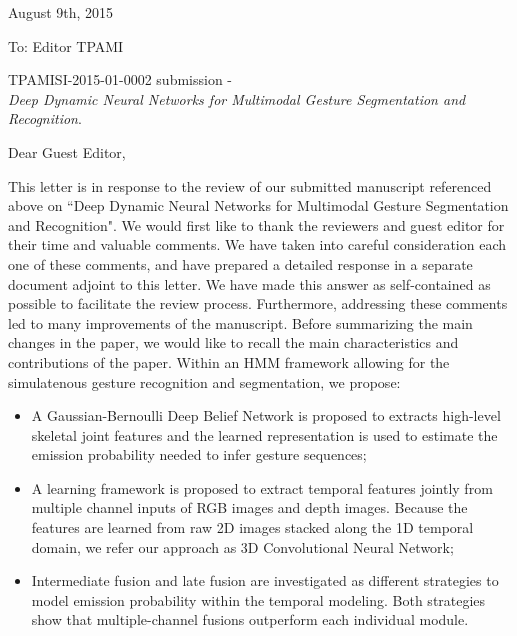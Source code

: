 \documentclass[12pt]{article}
\begin{document}
\begin{center}
\end{center}

\newcommand{\rev}[1]{{\noindent {\bf Comment:} {\it #1}}~\\}
\newcommand{\ans}[1]{{\noindent {\bf Response:} #1}~\\}


\begin{flushleft}
August 9th, 2015
\end{flushleft}

\vspace*{3mm}

\begin{flushleft}
To: Editor TPAMI
\end{flushleft}

\begin{flushleft}
TPAMISI-2015-01-0002 submission - \\
{\em Deep Dynamic Neural Networks for Multimodal Gesture Segmentation and Recognition}.
\end{flushleft}

\vspace*{3mm}

\pagestyle{empty}

\noindent Dear Guest Editor,
\newline



This letter is in response to the review of our submitted manuscript referenced above on
``Deep Dynamic Neural Networks for Multimodal Gesture Segmentation and Recognition".
%
We would first like to thank  the reviewers and guest editor for their time and valuable comments.
We have taken into careful consideration each one of these comments, and have prepared a detailed response
in a separate document adjoint to this letter.
We have made this answer as self-contained as possible to facilitate the review process.
%
Furthermore, addressing these comments led to many improvements of the manuscript.
%
Before summarizing the main changes in the paper, we would like to recall the main characteristics and
contributions of the paper. Within an HMM framework allowing for the simulatenous gesture recognition and segmentation, we propose:
\begin{itemize}
\item A Gaussian-Bernoulli Deep Belief Network is proposed to extracts high-level skeletal joint features and the learned representation is used to estimate the emission probability needed to infer gesture sequences;
\item A learning framework is proposed to extract temporal features jointly from multiple channel inputs of RGB images and depth images. Because the features are learned from raw 2D images stacked along the 1D temporal domain, we refer our approach as 3D Convolutional Neural Network;
\item Intermediate fusion and late fusion are investigated as different strategies to model emission probability within the temporal modeling. Both strategies show that multiple-channel fusions outperform each individual module.
\end{itemize}
\end{document}
